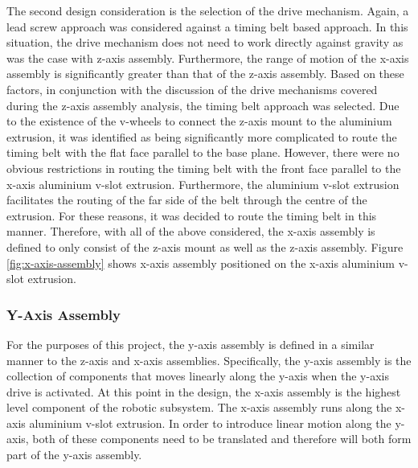 The second design consideration is the selection of the drive mechanism. Again, a lead screw approach was considered against a timing belt based approach. In this situation, the drive mechanism does not need to work directly against gravity as was the case with z-axis assembly. Furthermore, the range of motion of the x-axis assembly is significantly greater than that of the z-axis assembly. Based on these factors, in conjunction with the discussion of the drive mechanisms covered during the z-axis assembly analysis, the timing belt approach was selected. Due to the existence of the v-wheels to connect the z-axis mount to the aluminium extrusion, it was identified as being significantly more complicated to route the timing belt with the flat face parallel to the base plane. However, there were no obvious restrictions in routing the timing belt with the front face parallel to the x-axis aluminium v-slot extrusion. Furthermore, the aluminium v-slot extrusion facilitates the routing of the far side of the belt through the centre of the extrusion. For these reasons, it was decided to route the timing belt in this manner. Therefore, with all of the above considered, the x-axis assembly is defined to only consist of the z-axis mount as well as the z-axis assembly. Figure \ref{fig:x-axis-assembly} shows x-axis assembly positioned on the x-axis aluminium v-slot extrusion.


\subsubsection{Y-Axis Assembly}

For the purposes of this project, the y-axis assembly is defined in a similar manner to the z-axis and x-axis assemblies. Specifically, the y-axis assembly is the collection of components that moves linearly along the y-axis when the y-axis drive is activated. At this point in the design, the x-axis assembly is the highest level component of the robotic subsystem. The x-axis assembly runs along the x-axis aluminium v-slot extrusion. In order to introduce linear motion along the y-axis, both of these components need to be translated and therefore will both form part of the y-axis assembly.

